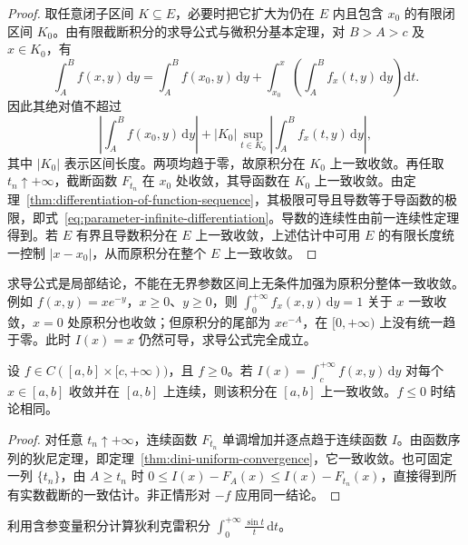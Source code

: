 \begin{proof}
取任意闭子区间 $K\subseteq E$，必要时把它扩大为仍在 $E$ 内且包含 $x_0$ 的有限闭区间 $K_0$。由有限截断积分的求导公式与微积分基本定理，对 $B>A>c$ 及 $x\in K_0$，有
\[
    \int_A^B f(x,y)\,\mathrm{d}y
    =\int_A^B f(x_0,y)\,\mathrm{d}y
      +\int_{x_0}^x\left(\int_A^B f_x(t,y)\,\mathrm{d}y\right)\mathrm{d}t.
\]
因此其绝对值不超过
\[
    \left|\int_A^B f(x_0,y)\,\mathrm{d}y\right|
    +|K_0|\sup_{t\in K_0}
       \left|\int_A^B f_x(t,y)\,\mathrm{d}y\right|,
\]
其中 $|K_0|$ 表示区间长度。两项均趋于零，故原积分在 $K_0$ 上一致收敛。再任取 $t_n\uparrow+\infty$，截断函数 $F_{t_n}$ 在 $x_0$ 处收敛，其导函数在 $K_0$ 上一致收敛。由定理~\ref{thm:differentiation-of-function-sequence}，其极限可导且导数等于导函数的极限，即式~\eqref{eq:parameter-infinite-differentiation}。导数的连续性由前一连续性定理得到。若 $E$ 有界且导数积分在 $E$ 上一致收敛，上述估计中可用 $E$ 的有限长度统一控制 $|x-x_0|$，从而原积分在整个 $E$ 上一致收敛。
\end{proof}

\begin{remark}
\label{rem:parameter-derivative-unbounded-domain}
求导公式是局部结论，不能在无界参数区间上无条件加强为原积分整体一致收敛。例如 $f(x,y)=xe^{-y}$，$x\geq0$、$y\geq0$，则 $\int_0^{+\infty}f_x(x,y)\,\mathrm{d}y=1$ 关于 $x$ 一致收敛，$x=0$ 处原积分也收敛；但原积分的尾部为 $xe^{-A}$，在 $[0,+\infty)$ 上没有统一趋于零。此时 $I(x)=x$ 仍然可导，求导公式完全成立。
\end{remark}

\begin{proposition}[非负积分的狄尼定理]
\label{prop:parameter-integral-dini}
设 $f\in C([a,b]\times[c,+\infty))$，且 $f\geq0$。若 $I(x)=\int_c^{+\infty}f(x,y)\,\mathrm{d}y$ 对每个 $x\in[a,b]$ 收敛并在 $[a,b]$ 上连续，则该积分在 $[a,b]$ 上一致收敛。$f\leq0$ 时结论相同。
\end{proposition}

\begin{proof}
对任意 $t_n\uparrow+\infty$，连续函数 $F_{t_n}$ 单调增加并逐点趋于连续函数 $I$。由函数序列的狄尼定理，即定理~\ref{thm:dini-uniform-convergence}，它一致收敛。也可固定一列 $\{t_n\}$，由 $A\geq t_n$ 时 $0\leq I(x)-F_A(x)\leq I(x)-F_{t_n}(x)$，直接得到所有实数截断的一致估计。非正情形对 $-f$ 应用同一结论。
\end{proof}

\begin{example}
\label{ex:parameter-dirichlet-integral-evaluation}
利用含参变量积分计算狄利克雷积分 $\displaystyle\int_0^{+\infty}\frac{\sin t}{t}\,\mathrm{d}t$。
\end{example}

